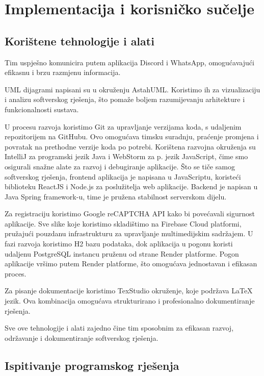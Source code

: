 \chapter{Implementacija i korisničko sučelje}
		
		
		\section{Korištene tehnologije i alati}
			
			Tim uspješno komunicira putem aplikacija Discord i WhatsApp, omogućavajući efikasnu i brzu razmjenu informacija. 
			
			UML dijagrami napisani su u okruženju AstahUML. Koristimo ih za vizualizaciju i analizu softverskog rješenja, što pomaže boljem razumijevanju arhitekture i funkcionalnosti sustava.
			
			U procesu razvoja koristimo Git za upravljanje verzijama koda, s udaljenim repozitorijem na GitHubu. Ovo omogućava timsku suradnju, praćenje promjena i povratak na prethodne verzije koda po potrebi. Korištena razvojna okruženja su IntelliJ za programski jezik Java i WebStorm za p. jezik JavaScript, čime smo osigurali snažne alate za razvoj i debugiranje aplikacije. Što se tiče samog softverskog rješenja, frontend aplikacija je napisana u JavaScriptu, koristeći biblioteku ReactJS i Node.js za poslužitelja web aplikacije. Backend je napisan u Java Spring framework-u, time je pružena stabilnost serverskom dijelu.
			
			Za registraciju koristimo Google reCAPTCHA API kako bi povećavali sigurnost aplikacije. Sve slike koje koristimo skladištimo na Firebase Cloud platformi, pružajući pouzdanu infrastrukturu za upravljanje multimedijskim sadržajem. 
			U fazi razvoja koristimo H2 bazu podataka, dok aplikacija u pogonu koristi udaljenu PostgreSQL instancu pruženu od strane Render platforme. Pogon aplikacije vršimo putem Render platforme, što omogućava jednostavan i efikasan proces.
			
			Za pisanje dokumentacije koristimo TexStudio okruženje, koje podržava LaTeX jezik. Ova kombinacija omogućava strukturirano i profesionalno dokumentiranje rješenja. 
			
			Sve ove tehnologije i alati zajedno čine tim sposobnim za efikasan razvoj, održavanje i dokumentiranje softverskog rješenja.
			
			\eject 
			
		\section{Ispitivanje programskog rješenja}
			
